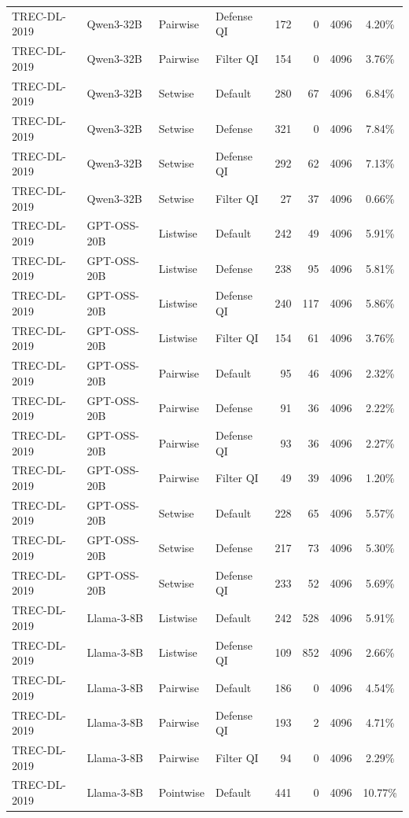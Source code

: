 \begin{table}[t]
\begin{tabular}{ll l l r r r c}
TREC-DL-2019 & Qwen3-32B & Pairwise & Defense QI & 172 & 0 & 4096 & 4.20\% \\
TREC-DL-2019 & Qwen3-32B & Pairwise & Filter QI & 154 & 0 & 4096 & 3.76\% \\
TREC-DL-2019 & Qwen3-32B & Setwise & Default & 280 & 67 & 4096 & 6.84\% \\
TREC-DL-2019 & Qwen3-32B & Setwise & Defense & 321 & 0 & 4096 & 7.84\% \\
TREC-DL-2019 & Qwen3-32B & Setwise & Defense QI & 292 & 62 & 4096 & 7.13\% \\
TREC-DL-2019 & Qwen3-32B & Setwise & Filter QI & 27 & 37 & 4096 & 0.66\% \\
TREC-DL-2019 & GPT-OSS-20B & Listwise & Default & 242 & 49 & 4096 & 5.91\% \\
TREC-DL-2019 & GPT-OSS-20B & Listwise & Defense & 238 & 95 & 4096 & 5.81\% \\
TREC-DL-2019 & GPT-OSS-20B & Listwise & Defense QI & 240 & 117 & 4096 & 5.86\% \\
TREC-DL-2019 & GPT-OSS-20B & Listwise & Filter QI & 154 & 61 & 4096 & 3.76\% \\
TREC-DL-2019 & GPT-OSS-20B & Pairwise & Default & 95 & 46 & 4096 & 2.32\% \\
TREC-DL-2019 & GPT-OSS-20B & Pairwise & Defense & 91 & 36 & 4096 & 2.22\% \\
TREC-DL-2019 & GPT-OSS-20B & Pairwise & Defense QI & 93 & 36 & 4096 & 2.27\% \\
TREC-DL-2019 & GPT-OSS-20B & Pairwise & Filter QI & 49 & 39 & 4096 & 1.20\% \\
TREC-DL-2019 & GPT-OSS-20B & Setwise & Default & 228 & 65 & 4096 & 5.57\% \\
TREC-DL-2019 & GPT-OSS-20B & Setwise & Defense & 217 & 73 & 4096 & 5.30\% \\
TREC-DL-2019 & GPT-OSS-20B & Setwise & Defense QI & 233 & 52 & 4096 & 5.69\% \\
TREC-DL-2019 & Llama-3-8B & Listwise & Default & 242 & 528 & 4096 & 5.91\% \\
TREC-DL-2019 & Llama-3-8B & Listwise & Defense QI & 109 & 852 & 4096 & 2.66\% \\
TREC-DL-2019 & Llama-3-8B & Pairwise & Default & 186 & 0 & 4096 & 4.54\% \\
TREC-DL-2019 & Llama-3-8B & Pairwise & Defense QI & 193 & 2 & 4096 & 4.71\% \\
TREC-DL-2019 & Llama-3-8B & Pairwise & Filter QI & 94 & 0 & 4096 & 2.29\% \\
TREC-DL-2019 & Llama-3-8B & Pointwise & Default & 441 & 0 & 4096 & 10.77\% \\

\end{tabular}
\end{table}
